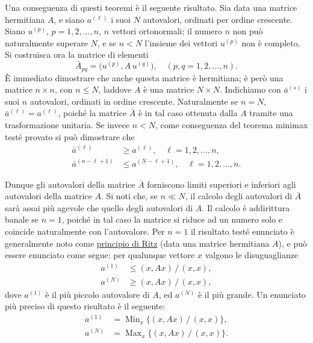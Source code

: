 \documentclass[11pt, a4paper]{book}
\numberwithin{equation}{section}
\begin{document}
Una conseguenza di questi teoremi è il seguente risultato. Sia data una
matrice hermitiana $A$, e siano $a^{(\ell)}$ i suoi $N$ autovalori,
ordinati per ordine crescente. Siano $u^{(p)}$, $p = 1, 2, \ldots, n$, $n$
vettori ortonormali; il numero $n$ non può naturalmente superare $N$, e se
$n < N$ l'insieme dei vettori $u^{(p)}$ non è completo. Si costruisca ora
la matrice di elementi
\[
\bar{A}_{pq} = \bigl(u^{(p)}, A\,u^{(q)}\bigr), \quad (p,q = 1,2,\ldots,n).
\]
È immediato dimostrare che anche questa matrice è hermitiana; è però una
matrice $n \times n$, con $n \leq N$, laddove $A$ è una matrice $N \times
N$. Indichiamo con $\bar{a}^{(s)}$ i suoi $n$ autovalori, ordinati in
ordine crescente. Naturalmente se $n = N$, $\bar{a}^{(\ell)} = a^{(\ell)}$,
poiché la matrice $\bar{A}$ è in tal caso ottenuta dalla $A$ tramite una
trasformazione unitaria. Se invece $n < N$, come conseguenza del teorema
minimax testé provato si può dimostrare che
\begin{align}
\bar{a}^{(\ell)} &\geq a^{(\ell)}, \quad \ell = 1,2,\ldots,n, \tag{19a} \\
\bar{a}^{(n-\ell+1)} &\leq a^{(N-\ell+1)}, \quad \ell = 1,2,\ldots,n. \tag{19b}
\end{align}


Dunque gli autovalori della matrice $\bar{A}$ forniscono limiti superiori e
inferiori agli autovalori della matrice $A$. Si noti che, se $n \ll N$, il
calcolo degli autovalori di $\bar{A}$ sarà assai più agevole che quello
degli autovalori di $A$. Il calcolo è addirittura banale se $n = 1$, poiché
in tal caso la matrice si riduce ad un numero solo e coincide naturalmente
con l'autovalore. Per $n=1$ il risultato testé enunciato è generalmente
noto come \uline{principio di Ritz} (data una matrice hermitiana $A$),
e può essere enunciato come segue: per qualunque vettore $x$ valgono le
disuguaglianze
\begin{align}
a^{(1)} &\leq (x, Ax)\,/\,(x,x), \tag{20a} \\
a^{(N)} &\geq (x, Ax)\,/\,(x,x), \tag{20b}
\end{align}
dove $a^{(1)}$ è il più piccolo autovalore di $A$, ed $a^{(N)}$ è il più
grande. Un enunciato più preciso di questo risultato è il seguente:
\begin{align}
a^{(1)} &= \operatorname{Min}_x\bigl\{(x,Ax)\,/\,(x,x)\bigr\}, \tag{21a} \\
a^{(N)} &= \operatorname{Max}_x\bigl\{(x,Ax)\,/\,(x,x)\bigr\}. \tag{21b}
\end{align}
\end{document}
